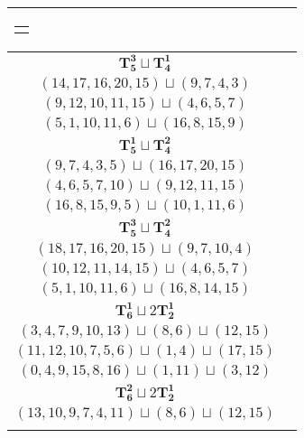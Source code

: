 \documentclass{article}
\begin{document}
\begin{longtable}{|c|c|}
\begin{tabular}{c}
        $(16,8,15,9,12)\sqcup(10,1,11,6)$
        \end{tabular} \\ 
        \hline
        $\mathbf{T_{5}^{3}} \sqcup \mathbf{T_{4}^{1}}$ & \begin{tabular}{c}
        $(13,15,16,18,14)\sqcup(11,9,6,7)$ \\ 
        $(14,17,16,20,15)\sqcup(9,7,4,3)$ \\ 
        $(9,12,10,11,15)\sqcup(4,6,5,7)$ \\ 
        $(5,1,10,11,6)\sqcup(16,8,15,9)$
        \end{tabular} \\ 
        \hline
        $\mathbf{T_{5}^{1}} \sqcup \mathbf{T_{4}^{2}}$ & \begin{tabular}{c}
        $(7,6,9,11,8)\sqcup(16,15,13,14)$ \\ 
        $(9,7,4,3,5)\sqcup(16,17,20,15)$ \\ 
        $(4,6,5,7,10)\sqcup(9,12,11,15)$ \\ 
        $(16,8,15,9,5)\sqcup(10,1,11,6)$
        \end{tabular} \\ 
        \hline
        $\mathbf{T_{5}^{3}} \sqcup \mathbf{T_{4}^{2}}$ & \begin{tabular}{c}
        $(13,15,16,18,14)\sqcup(11,9,12,6)$ \\ 
        $(18,17,16,20,15)\sqcup(9,7,10,4)$ \\ 
        $(10,12,11,14,15)\sqcup(4,6,5,7)$ \\ 
        $(5,1,10,11,6)\sqcup(16,8,14,15)$
        \end{tabular} \\ 
        \hline
        $\mathbf{T_{6}^{1}} \sqcup 2\mathbf{T_{2}^{1}}$ & \begin{tabular}{c}
        $(1,2,4,6,9,12)\sqcup(13,14)\sqcup(8,7)$ \\ 
        $(3,4,7,9,10,13)\sqcup(8,6)\sqcup(12,15)$ \\ 
        $(11,12,10,7,5,6)\sqcup(1,4)\sqcup(17,15)$ \\ 
        $(0,4,9,15,8,16)\sqcup(1,11)\sqcup(3,12)$
        \end{tabular} \\ 
        \hline
        $\mathbf{T_{6}^{2}} \sqcup 2\mathbf{T_{2}^{1}}$ & \begin{tabular}{c}
        $(1,2,4,6,9,5)\sqcup(13,14)\sqcup(8,7)$ \\ 
        $(13,10,9,7,4,11)\sqcup(8,6)\sqcup(12,15)$ \\ 

\end{tabular}
\end{longtable}
\end{document}
